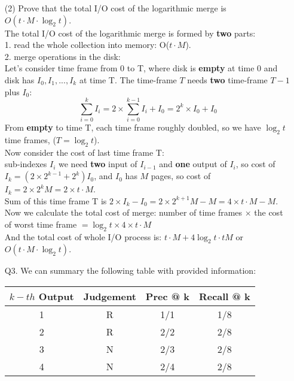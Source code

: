 \documentclass[12pt, letterpaper, twoside]{article}
\begin{document}
\begin{enumerate}
        (2) Prove that the total I/O cost of the logarithmic merge is $O(t \cdot M \cdot \log_2 t)$.\\
        The total I/O cost of the logarithmic merge is formed by \textbf{two} parts:\\
        1. read the whole collection into memory: O($t\cdot M$).\\
        2. merge operations in the disk:\\
        Let's consider time frame from 0 to T, where disk is \textbf{empty} at time 0 and disk has $I_0, I_1, ..., I_k$ at time T.
        The time-frame $T$ needs \textbf{two} time-frame $T-1$ plus $I_0$:\\
        \begin{equation}
            \sum_{i = 0}^{k}I_i = 2\times \sum_{i = 0}^{k-1}I_i + I_0 = 2^k\times I_0 + I_0
        \end{equation}
        From \textbf{empty} to time T, each time frame roughly doubled, so we have $\log_2 t$ time frames, ($T = \log_2 t$).\\
        Now consider the cost of last time frame T:\\
         sub-indexes $I_i$ we need \textbf{two} input of $I_{i-1}$ and \textbf{one} output of $I_i$, so cost of $I_k = (2\times 2^{k-1} + 2^{k})I_0$, and $I_0$ has $M$ pages, so cost of $I_k = 2\times 2^{k}M = 2\times t\cdot M$.\\
        Sum of this time frame T is $2\times I_k - I_0 = 2\times 2^{k+1}M - M = 4\times t\cdot M - M$.\\
        Now we calculate the total cost of merge: number of time frames $\times$ the cost of worst time frame $ = \log_2 t \times 4\times t\cdot M$\\
        And the total cost of whole I/O process is: $t\cdot M + 4\log_2 t\cdot tM$ or $O(t\cdot M\cdot \log_2 t)$.
    \item[Q3.]
    We can summary the following table with provided information:\\
    \begin{center}
    \begin{tabular}{||c | c | c | c||}
    \hline
    $k-th$ Output & Judgement & Prec @ k & Recall @ k \\ [0.5ex]
    \hline\hline
    1 & R & 1/1 & 1/8 \\
    \hline
    2 & R & 2/2 & 2/8\\
    \hline
    3 & N & 2/3 & 2/8\\
    \hline
    4 & N & 2/4 & 2/8\\

\end{tabular}
\end{center}
\end{enumerate}
\end{document}
